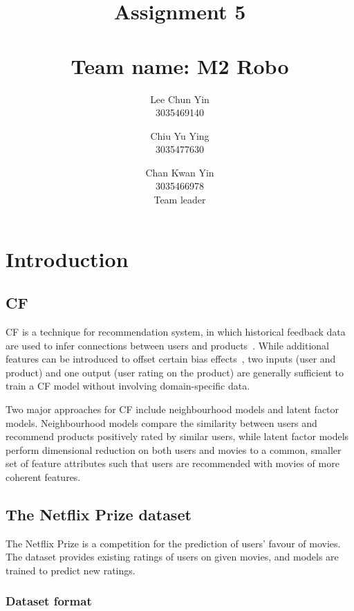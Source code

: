\documentclass[final]{cvpr}
\begin{document}
\title{
	Assignment 5 \\~\\
	\large{Team name: M2 Robo}
}

\author{
	Lee Chun Yin\\
	3035469140\\
	\and
	Chiu Yu Ying\\
	3035477630
	\and
	Chan Kwan Yin\\
	3035466978 \\
	Team leader
}

\maketitle

\clearpage

\section{Introduction}
\subsection{\ac{CF}}
\ac{CF} is a technique for recommendation system,
in which historical feedback data are used to infer connections between users and products~\cite{FactorMeet}.
While additional features can be introduced to offset certain bias effects~\cite{BellKor2008},
two inputs (user and product) and one output (user rating on the product) are generally sufficient
to train a \ac{CF} model without involving domain-specific data.

Two major approaches for \ac{CF} include neighbourhood models and latent factor models.
Neighbourhood models compare the similarity between users
and recommend products positively rated by similar users,
while latent factor models perform dimensional reduction on both users and movies
to a common, smaller set of feature attributes such that
users are recommended with movies of more coherent features.

\subsection{The Netflix Prize dataset}
The Netflix Prize is a competition for the prediction of users' favour of movies.
The dataset provides existing ratings of users on given movies,
and models are trained to predict new ratings.

\subsubsection{Dataset format}
\end{document}
